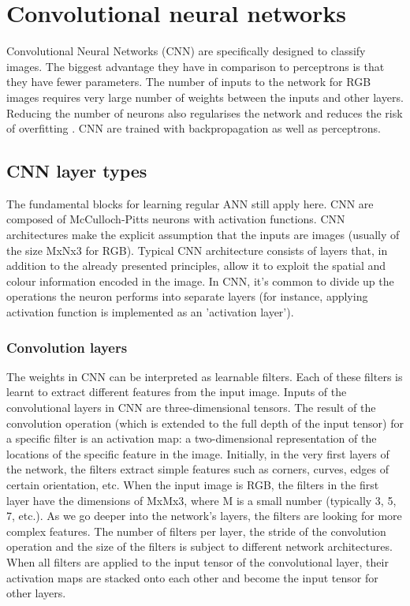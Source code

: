 \section{Convolutional neural networks}

Convolutional Neural Networks (CNN) are specifically designed to classify images. The biggest advantage they have in comparison to perceptrons is that they have fewer parameters. The number of inputs to the network for RGB images requires very large number of weights between the inputs and other layers. Reducing the number of neurons also regularises the network and reduces the risk of overfitting \cite{mehlig}. CNN are trained with backpropagation as well as perceptrons. 

\subsection{CNN layer types}
The fundamental blocks for learning regular ANN still apply here. CNN are composed of McCulloch-Pitts neurons with activation functions. CNN architectures make the explicit assumption that the inputs are images (usually of the size MxNx3 for RGB). Typical CNN architecture consists of layers that, in addition to the already presented principles, allow it to exploit the spatial and colour information encoded in the image. \cite{stanford-github} In CNN, it's common to divide up the operations the neuron performs into separate layers (for instance, applying activation function is implemented as an 'activation layer').

\subsubsection{Convolution layers}  

The weights in CNN can be interpreted as learnable filters. Each of these filters is learnt to extract different features from the input image. Inputs of the convolutional layers in CNN are three-dimensional tensors. The result of the convolution operation (which is extended to the full depth of the input tensor) for a specific filter is an activation map: a two-dimensional representation of the locations of the specific feature in the image. Initially, in the very first layers of the network, the filters extract simple features such as corners, curves, edges of certain orientation, etc. When the input image is RGB, the filters in the first layer have the dimensions of MxMx3, where M is a small number (typically 3, 5, 7, etc.). As we go deeper into the network's layers, the filters are looking for more complex features. The number of filters per layer, the stride of the convolution operation and the size of the filters is subject to different network architectures. When all filters are applied to the input tensor of the convolutional layer, their activation maps are stacked onto each other and become the input tensor for other layers. \cite{stanford-github}

